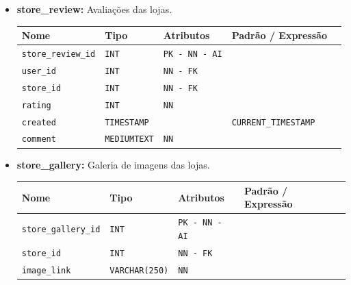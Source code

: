 \begin{itemize}
    \item \textbf{store\_review:}
    Avaliações das lojas. 
    \begin{table}[H]
        \centering
        \begin{tabularx}{\linewidth}{XXXXX}
        \toprule
        \textbf{\color{color_scheme}Nome} & \textbf{\color{color_scheme}Tipo} & \textbf{\color{color_scheme}Atributos} & \textbf{\color{color_scheme}Padrão / Expressão}\\
        \midrule
        \texttt{store\_review\_id} & \texttt{INT} & \texttt{PK - NN - AI} &\\
        \texttt{user\_id} & \texttt{INT} & \texttt{NN - FK} &\\
        \texttt{store\_id} & \texttt{INT} & \texttt{NN - FK} &\\
        \texttt{rating} & \texttt{INT}  & \texttt{NN}  & \\
        \texttt{created} & \texttt{TIMESTAMP}  &  & \texttt{CURRENT\_TIMESTAMP}\\
        \texttt{comment} & \texttt{MEDIUMTEXT}  & \texttt{NN} & \\
        \bottomrule
        \end{tabularx}
        \label{table: store_reviews}
    \end{table}

    \newpage

    \item \textbf{store\_gallery:}
    Galeria de imagens das lojas. 
    \begin{table}[H]
        \centering
        \begin{tabularx}{\linewidth}{XXXXX}
        \toprule
        \textbf{\color{color_scheme}Nome} & \textbf{\color{color_scheme}Tipo} & \textbf{\color{color_scheme}Atributos} & \textbf{\color{color_scheme}Padrão / Expressão}\\
        \midrule
        \texttt{store\_gallery\_id} & \texttt{INT} & \texttt{PK - NN - AI} &\\
        \texttt{store\_id} & \texttt{INT} & \texttt{NN - FK} & \\
        \texttt{image\_link} & \texttt{VARCHAR(250)}  & \texttt{NN} & \\
        \bottomrule
        \end{tabularx}
        \label{table: store_gallery}
    \end{table}


\end{itemize}
